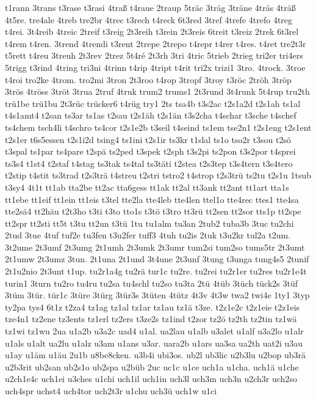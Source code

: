{t1rann
3trans
t3rase
t3rasi
4traß
t4raue
2traup
5träc
3träg
3träne
4träs
4träß
4t5re.
tre4ale
4treb
tre2br
4trec
t3rech
t4reck
6t3red
3tref
4trefe
4trefo
4treg
t4rei.
3t4reib
4treic
2treif
t3reig
2t3reih
t3rein
2t3reis
6treit
t3reiz
2trek
6t3rel
t4rem
t4ren.
3trend
4trendi
t3rent
2trepe
2trepo
t4repr
t4rer
t4res.
t4ret
tre2t3r
t5rett
t4reu
3treuh
2t3rev
2trez
5t4ré
2t3rh
3tri
4tric
5trieb
2trieg
tri2er
tri4ers
5trigg
t3rind
4tring
tri3ni
4trinn
t4rip
4tript
t4rit
tri2x
trizi1
3tro.
4trock.
3troe
t4roi
tro2ke
4trom.
tro2mi
3tron
2t3roo
t4rop
3tropf
3troy
t3röc
2tröh
3tröp
3trös
4tröss
3tröt
3trua
2truf
4truk
trum2
trums1
2t3rund
3t4runk
5t4rup
tru2th
trü1be
trü1bu
2t3rüc
trücker6
t4rüg
try1
2ts
tsa4b
t3s2ac
t2s1a2d
t2s1ah
ts1al
t4s1amt4
t2san
ts3ar
ts1as
t2sau
t2s1äh
t2s1än
t3s2cha
t4schar
t3sche
t4schef
ts4chem
tsch4li
t4schro
ts4cor
t2s1e2b
t3seil
t4seind
ts1em
tse2n1
t2s1eng
t2s1ent
t2s1er
t6s5essen
t2s1i2d
tsing4
ts1ini
t2s1ir
ts3kr
t1slal
ts1o
tso2r
t3sou
t2sö
t3spal
ts1par
ts4pare
t2spä
ts2ped
t3spek
t2sph
t3s2pi
ts2pon
t3s2por
t4sprei
ts3s4
t1st4
t2staf
t4stag
ts3tak
ts4tal
ts3täti
t2stea
t2s3tep
t3s4tern
t3s4tero
t2stip
t4stit
ts3trad
t2s3trä
t4streu
t2stri
tstro2
t4strop
t2s3trü
ts2tu
t2s1u
1tsub
t3sy4
4t1t
tt1ab
tta2be
tt2ac
tta6gess
tt1ak
tt2al
tt3ank
tt2ant
tt1art
tta1s
tt1ebe
tt1eif
tt1ein
tt1eis
t3tel
tte2la
tte4leb
tte4len
ttel1o
tte4rec
ttes1
tte4sa
tte2sä4
tt2häu
t2t3ho
t3ti
t3to
tto1s
t3tö
t3tro
tt3rü
tt2sen
tt2sor
tts1p
tt2spe
tt2spr
tt2sti
tt5t
t3tu
tt2un
t3tü
1tu
tu1alm
tu3an
2tub2
tuba3b
3tuc
tu2chi
2tud
3tue
4tuf
tuf2e
tu3fen
t3u2fer
tuff3
4tuh
tu2is
2tuk
t3u2kr
tul2a
t2um.
3t2ume
2t3umf
2t3umg
2t1umh
2t3umk
2t3umr
tum2si
tum2so
tums5tr
2t3umt
2t1umw
2t3umz
3tun.
2t1una
2t1und
3t4une
2t3unf
3tung
t3unga
tung4s5
2tunif
2t1u2nio
2t3unt
t1up.
tu2r1a4g
tu2rä
tur1c
tu2re.
tu2rei
tu2r1er
tu2res
tu2r1e4t
turin1
3turn
tu2ro
tu4ru
tu2sa
tu4schl
tu2so
tu3ta
2tü
4tüb
3tüch
tück2s
3tüf
3tüm
3tür.
tür1c
3türe
3türg
3tür3s
3tüten
4tütz
4t3v
4t3w
twa2
twi4e
1ty1
3typ
ty2pa
tys4
6t1z
t2za4
tz1ag
tz1al
tz1ar
tz1au
tz1ä
t3ze.
t2z1e2c
t2z1eie
t2z1eis
tze4n1
tz2ene
tz3ents
tz1erl
tz2ers
t3ze2s
tz1ind
t2zor
tz2ö
tz2th
tz2tin
tz1wä
tz1wi
tz1wu
2ua
u1a2b
u3a2c
uad4
u1al.
ua2lau
u1alb
u3alet
u1alf
u3a2lo
u1alr
u1als
u1alt
ua2lu
u1alz
u3am
u1ans
u3ar.
uara2b
u1ars
ua3sa
ua2th
uat2i
u3au
u1ay
u1äm
u1äu
2u1b
u8be8cken.
u3b4i
ubi3os.
ub2l
ub3lic
u2b3lu
u2bop
ub3rä
u2b3rit
ub2san
ub2s1o
ub2spa
u2büb
2uc
uc1c
u1ce
uch1a
u1cha.
uch1ä
u1che
u2ch1e4c
uch1ei
u3ches
u1chi
uch1il
uch1in
uch3l
uch3m
uch3n
u2ch3r
uch2so
uch4spr
uchst4
uch4tor
uch2t3r
u1chu
uch3ü
uch1w
u1ci
}

